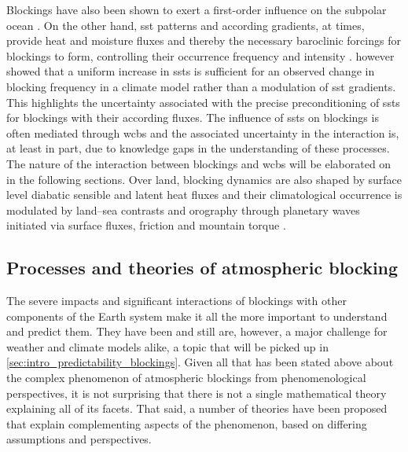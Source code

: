 Blockings have also been shown to exert a first-order influence on the subpolar
ocean \parencite{hakkinenAtmosphericBlockingAtlantic2011}. On the other hand,
\gls{sst} patterns and according gradients, at times, provide heat and moisture
fluxes and thereby the necessary baroclinic forcings for blockings to form,
controlling their occurrence frequency and intensity
\parencite{christSeaSkyUnderstanding2025, mathewsGulfStreamMoisture2024}.
\textcite{narinesinghUniformSSTWarming2024} however showed that a uniform
increase in \glspl{sst} is sufficient for an observed change in blocking
frequency in a climate model rather than a modulation of \gls{sst} gradients.
This highlights the uncertainty associated with the precise preconditioning of
\glspl{sst} for blockings with their according fluxes. The influence of
\glspl{sst} on blockings is often mediated through \glspl{wcb} and the
associated uncertainty in the interaction is, at least in part, due to
knowledge gaps in the understanding of these processes. The nature of the
interaction between blockings and \glspl{wcb} will be elaborated
on in the following sections. Over land, blocking dynamics are also shaped by
surface level diabatic sensible and latent heat fluxes
\parencite{tillyCalculatedHeightTendencies2008} and their climatological
occurrence is modulated by land--sea contrasts and orography
through planetary waves \parencite{heImpactLandSea2014} initiated via
surface fluxes, friction and mountain torque
\parencite{kallenBifurcationPropertiesQuasigeostrophic1982,
    metzWintertimeBlockingMountain1985}.

\subsection{Processes and theories of atmospheric blocking}
\label{sec:intro_blocking_theories}
The severe impacts and significant interactions of blockings with other
components of the Earth system make it all the more important to understand
and predict them. They have been and still are, however, a major challenge for
weather and climate models alike, a topic that will be picked up in
\cref{sec:intro_predictability_blockings}. Given all that has been stated above
about the complex phenomenon of atmospheric blockings from phenomenological
perspectives, it is not surprising that
there is not a single mathematical theory explaining all of its facets. That
said, a number of theories have been proposed that explain complementing
aspects of the phenomenon, based on differing assumptions and perspectives.

